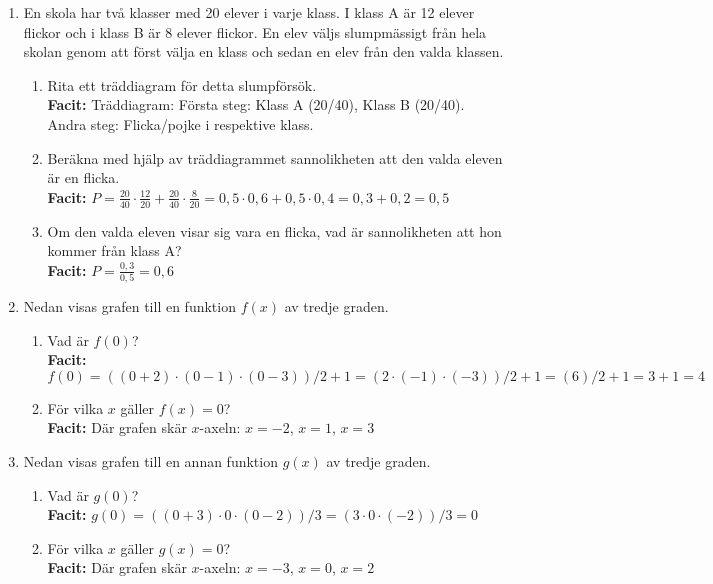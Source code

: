 \documentclass[a4paper,11pt]{article}
\begin{document}
\begin{enumerate}[label=\textbf{\arabic*.}]
    \item En skola har två klasser med 20 elever i varje klass. I klass A är 12 elever flickor och i klass B är 8 elever flickor. En elev väljs slumpmässigt från hela skolan genom att först välja en klass och sedan en elev från den valda klassen.
    \begin{enumerate}[label=\alph*)]
        \item Rita ett träddiagram för detta slumpförsök.
        \\ \textbf{Facit:} Träddiagram: Första steg: Klass A (20/40), Klass B (20/40). Andra steg: Flicka/pojke i respektive klass.
        \item Beräkna med hjälp av träddiagrammet sannolikheten att den valda eleven är en flicka.
        \\ \textbf{Facit:} $P=\frac{20}{40}\cdot\frac{12}{20}+\frac{20}{40}\cdot\frac{8}{20}=0,5\cdot0,6+0,5\cdot0,4=0,3+0,2=0,5$
        \item Om den valda eleven visar sig vara en flicka, vad är sannolikheten att hon kommer från klass A?
        \\ \textbf{Facit:} $P=\frac{0,3}{0,5}=0,6$
    \end{enumerate}
    \item Nedan visas grafen till en funktion $f(x)$ av tredje graden.
    \begin{enumerate}[label=\alph*)]
        \item Vad är $f(0)$?
        \\ \textbf{Facit:} $f(0) = ((0+2)\cdot(0-1)\cdot(0-3))/2 + 1 = (2\cdot(-1)\cdot(-3))/2 + 1 = (6)/2 + 1 = 3 + 1 = 4$
        \item För vilka $x$ gäller $f(x) = 0$?
        \\ \textbf{Facit:} Där grafen skär $x$-axeln: $x = -2$, $x = 1$, $x = 3$
    \end{enumerate}

    \item Nedan visas grafen till en annan funktion $g(x)$ av tredje graden.
    \begin{enumerate}[label=\alph*)]
        \item Vad är $g(0)$?
        \\ \textbf{Facit:} $g(0) = ((0+3)\cdot0\cdot(0-2))/3 = (3\cdot0\cdot(-2))/3 = 0$
        \item För vilka $x$ gäller $g(x) = 0$?
        \\ \textbf{Facit:} Där grafen skär $x$-axeln: $x = -3$, $x = 0$, $x = 2$
    \end{enumerate}

\end{enumerate}
\end{document}
